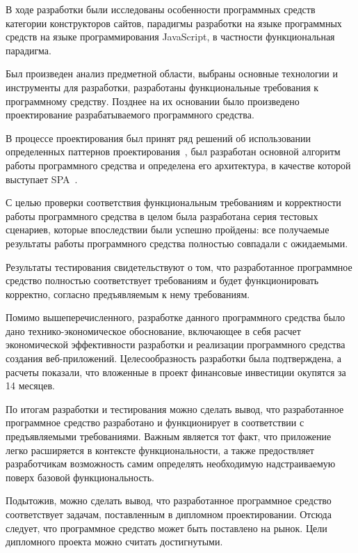 
В ходе разработки были исследованы особенности программных средств категории конструкторов сайтов, парадигмы разработки на языке программных средств на языке программирования JavaScript, в частности функциональная парадигма.

Был произведен анализ предметной области, выбраны основные технологии и инструменты для разработки, разработаны функциональные требования к программному средству. Позднее на их основании было произведено проектирование разрабатываемого программного средства.

В процессе проектирования был принят ряд решений об использовании определенных паттернов проектирования~\cite{wiki_design_patterns}, был разработан основной алгоритм работы программного средства и определена его архитектура, в качестве которой выступает SPA~\cite{wiki_spa}.

С целью проверки соответствия функциональным требованиям и корректности работы программного средства в целом была разработана серия тестовых сценариев, которые впоследствии были успешно пройдены: все получаемые результаты работы программного средства полностью совпадали с ожидаемыми.

Результаты тестирования свидетельствуют о том, что разработанное программное средство полностью соответствует требованиям и будет функционировать корректно, согласно предъявляемым к нему требованиям.

Помимо вышеперечисленного, разработке данного программного средства было дано технико-экономическое обоснование, включающее в себя расчет экономической эффективности разработки и реализации программного средства создания веб-приложений. Целесообразность разработки была подтверждена, а расчеты показали, что вложенные в проект финансовые инвестиции окупятся за 14 месяцев.

По итогам разработки и тестирования можно сделать вывод, что разработанное программное средство разработано и функционирует в соответствии с предъявляемыми требованиями. Важным является тот факт, что приложение легко расширяется в контексте функциональности, а также предоствляет разработчикам возможность самим определять необходимую надстраиваемую поверх базовой функциональность.

Подытожив, можно сделать вывод, что разработанное программное средство соответствует задачам, поставленным в дипломном проектировании. Отсюда следует, что программное средство может быть поставлено на рынок. Цели дипломного проекта можно считать достигнутыми.